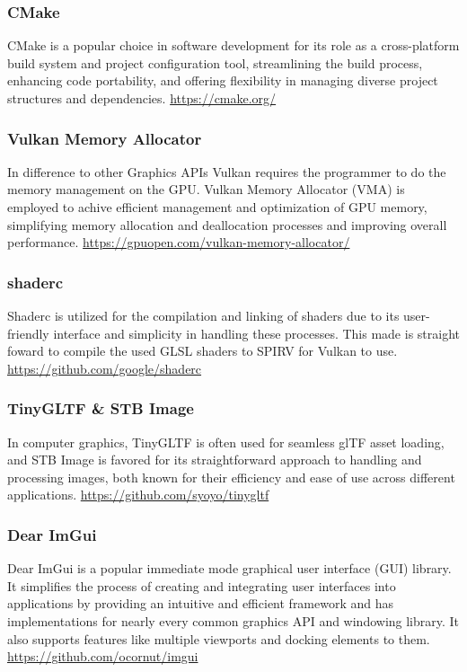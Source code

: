 \documentclass[intern]{cgMA}
\begin{document}
    \subsubsection*{CMake}    
    CMake is a popular choice in software development for its role as a cross-platform build system and project configuration tool, streamlining the build process, enhancing code portability, and offering flexibility in managing diverse project structures and dependencies. \url{https://cmake.org/}

    \subsubsection*{Vulkan Memory Allocator}   
    In difference to other Graphics APIs Vulkan requires the programmer to do the memory management on the GPU. Vulkan Memory Allocator (VMA) is employed to achive efficient management and optimization of GPU memory, simplifying memory allocation and deallocation processes and improving overall performance. \url{https://gpuopen.com/vulkan-memory-allocator/}

    \subsubsection*{shaderc}   
    Shaderc is utilized for the compilation and linking of shaders due to its user-friendly interface and simplicity in handling these processes. This made is straight foward to compile the used GLSL shaders to SPIRV for Vulkan to use. \url{https://github.com/google/shaderc}

    \subsubsection*{TinyGLTF \& STB Image}  
    In computer graphics, TinyGLTF is often used for seamless glTF asset loading, and STB Image is favored for its straightforward approach to handling and processing images, both known for their efficiency and ease of use across different applications. \url{https://github.com/syoyo/tinygltf}

    \subsubsection*{Dear ImGui}
    Dear ImGui is a popular immediate mode graphical user interface (GUI) library. It simplifies the process of creating and integrating user interfaces into applications by providing an intuitive and efficient framework and has implementations for nearly every common graphics API and windowing library. It also supports features like multiple viewports and docking elements to them. \url{https://github.com/ocornut/imgui}
\end{document}
